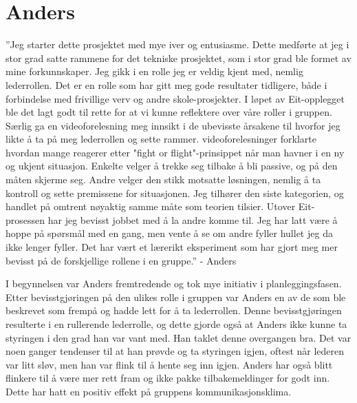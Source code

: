 \section{Anders}
''Jeg starter dette prosjektet med mye iver og entusiasme. 
Dette medførte at jeg i stor grad satte rammene for det tekniske prosjektet, som i stor grad ble formet av mine forkunnskaper.
Jeg gikk i en rolle jeg er veldig kjent med, nemlig lederrollen. 
Det er en rolle som har gitt meg gode resultater tidligere, både i forbindelse med frivillige verv og andre skole-prosjekter.
I løpet av Eit-opplegget ble det lagt godt til rette for at vi kunne reflektere over våre roller i gruppen.
Særlig ga en videoforelesning meg innsikt i de ubevisste årsakene til hvorfor jeg likte å ta på meg lederrollen og sette rammer. 
videoforelesninger forklarte hvordan mange reagerer etter "fight or flight"-prinsippet når man havner i en ny og ukjent situasjon.
Enkelte velger å trekke seg tilbake å bli passive, og på den måten skjerme seg. 
Andre velger den stikk motsatte løsningen, nemlig å ta kontroll og sette premissene for situasjonen. 
Jeg tilhører den siste kategorien, og handlet på omtrent nøyaktig samme måte som teorien tilsier.
Utover Eit-prosessen har jeg bevisst jobbet med å la andre komme til.
Jeg har latt være å hoppe på spørsmål med en gang, men vente å se om andre fyller hullet jeg da ikke lenger fyller. Det har vært et lærerikt eksperiment som har gjort meg mer bevisst på de forskjellige rollene i en gruppe.'' \hfill - Anders
\vspace{\secspace}

I begynnelsen var Anders fremtredende og tok mye initiativ i planleggingsfasen. 
Etter bevisstgjøringen på den ulikes rolle i gruppen var Anders en av de som ble beskrevet som frempå og hadde lett for å ta lederrollen. 
Denne bevisstgjøringen resulterte i en rullerende lederrolle, og dette gjorde også at Anders ikke kunne ta styringen i den grad han var vant med. 
Han taklet denne overgangen bra. 
Det var noen ganger tendenser til at han prøvde og ta styringen igjen, oftest når lederen var litt sløv, men han var flink til å hente seg inn igjen. 
Anders har også blitt flinkere til å være mer rett fram og ikke pakke tilbakemeldinger for godt inn. 
Dette har hatt en positiv effekt på gruppens kommunikasjonsklima. 

